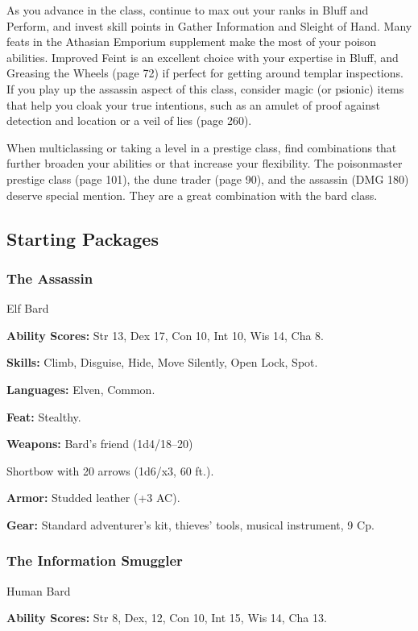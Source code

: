 \documentclass[10pt,a4paper,twocolumn]{d20}
\begin{document}
{As you advance in the class, continue to max out your ranks in Bluff and Perform, and invest skill points in Gather Information and Sleight of Hand. Many feats in the Athasian Emporium supplement make the most of your poison abilities. Improved Feint is an excellent choice with your expertise in Bluff, and Greasing the Wheels (page 72) if perfect for getting around templar inspections. If you play up the assassin aspect of this class, consider magic (or psionic) items that help you cloak your true intentions, such as an amulet of proof against detection and location or a veil of lies (page 260).

When multiclassing or taking a level in a prestige class, find combinations that further broaden your abilities or that increase your flexibility. The poisonmaster prestige class (page 101), the dune trader (page 90), and the assassin (DMG 180) deserve special mention. They are a great combination with the bard class.

\subsection{Starting Packages}
\subsubsection{The Assassin}

Elf Bard

\textbf{Ability Scores:} Str 13, Dex 17, Con 10, Int 10, Wis 14, Cha 8.

\textbf{Skills:} Climb, Disguise, Hide, Move Silently, Open Lock, Spot.

\textbf{Languages:} Elven, Common.

\textbf{Feat:} Stealthy.

\textbf{Weapons:} Bard’s friend (1d4/18–20)

Shortbow with 20 arrows (1d6/x3, 60 ft.).

\textbf{Armor:} Studded leather (+3 AC).

\textbf{Gear:} Standard adventurer’s kit, thieves’ tools, musical instrument, 9 Cp.

\subsubsection{The Information Smuggler}

Human Bard

\textbf{Ability Scores:} Str 8, Dex, 12, Con 10, Int 15, Wis 14, Cha 13.

}
\end{document}
